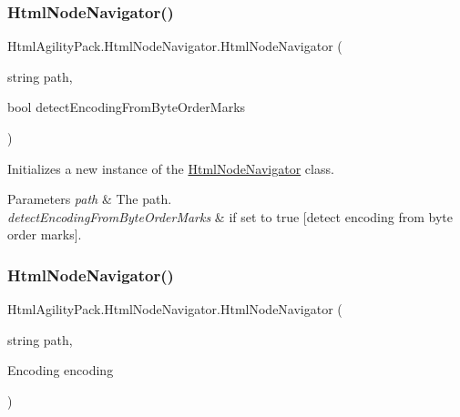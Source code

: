 \subsubsection{\texorpdfstring{Html\+Node\+Navigator()}{HtmlNodeNavigator()}\hspace{0.1cm}{\footnotesize\ttfamily [6/11]}}
{\footnotesize\ttfamily Html\+Agility\+Pack.\+Html\+Node\+Navigator.\+Html\+Node\+Navigator (\begin{DoxyParamCaption}\item[{string}]{path,  }\item[{bool}]{detect\+Encoding\+From\+Byte\+Order\+Marks }\end{DoxyParamCaption})\hspace{0.3cm}{\ttfamily [inline]}}



Initializes a new instance of the \hyperlink{class_html_agility_pack_1_1_html_node_navigator}{Html\+Node\+Navigator} class. 


\begin{DoxyParams}{Parameters}
{\em path} & The path.\\
\hline
{\em detect\+Encoding\+From\+Byte\+Order\+Marks} & if set to {\ttfamily true} \mbox{[}detect encoding from byte order marks\mbox{]}.\\
\hline
\end{DoxyParams}
\mbox{\label{class_html_agility_pack_1_1_html_node_navigator_ad52432337d1fcab9bd3cd5c869c96414}} 
\subsubsection{\texorpdfstring{Html\+Node\+Navigator()}{HtmlNodeNavigator()}\hspace{0.1cm}{\footnotesize\ttfamily [7/11]}}
{\footnotesize\ttfamily Html\+Agility\+Pack.\+Html\+Node\+Navigator.\+Html\+Node\+Navigator (\begin{DoxyParamCaption}\item[{string}]{path,  }\item[{Encoding}]{encoding }\end{DoxyParamCaption})\hspace{0.3cm}{\ttfamily [inline]}}



